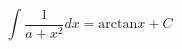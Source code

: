     \begin{center}
        \begin{equation*}
            \int \frac{1}{a+x^2}dx = \text{arctan} x + C
        \end{equation*}
    \end{center}
